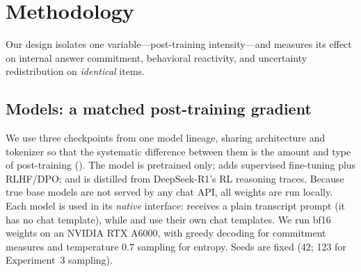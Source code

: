 \section{Methodology}
\label{sec:method}

Our design isolates one variable---post-training intensity---and measures its effect on
internal answer commitment, behavioral reactivity, and uncertainty redistribution on
\emph{identical} items.

\subsection{Models: a matched post-training gradient}
\label{sec:models}

We use three checkpoints from one model lineage, sharing architecture and tokenizer so that
the systematic difference between them is the amount and type of post-training
(). The \base model is pretrained only; \instruct adds supervised
fine-tuning plus RLHF/DPO; and \rlm is distilled from DeepSeek-R1's RL reasoning traces.
Because true base models are not served by any chat API, all weights are run locally. Each
model is used in its \emph{native} interface: \base receives a plain transcript prompt (it
has no chat template), while \instruct and \rlm use their own chat templates. We run bf16
weights on an NVIDIA RTX A6000, with greedy decoding for commitment measures and temperature
$0.7$ sampling for entropy. Seeds are fixed (42; 123 for Experiment~3 sampling).

\begin{table}[t]
    \centering
    \caption{The matched post-training gradient. All three models share the \qwenbase
    architecture and tokenizer lineage, so post-training stage is the only systematic
    difference.}
    \label{tab:models}
\end{table}

